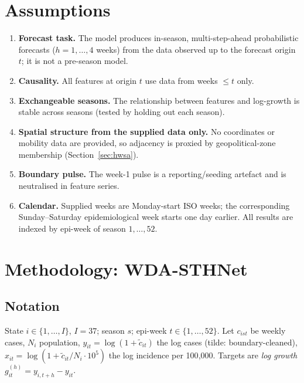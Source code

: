 \documentclass[11pt,a4paper]{article}
\begin{document}
\section{Assumptions}
\begin{enumerate}
\item[\textbf{A1}] \textbf{Forecast task.} The model produces in-season, multi-step-ahead probabilistic forecasts ($h=1,\dots,4$ weeks) from the data observed up to the forecast origin $t$; it is not a pre-season model.
\item[\textbf{A2}] \textbf{Causality.} All features at origin $t$ use data from weeks $\le t$ only.
\item[\textbf{A3}] \textbf{Exchangeable seasons.} The relationship between features and log-growth is stable across seasons (tested by holding out each season).
\item[\textbf{A4}] \textbf{Spatial structure from the supplied data only.} No coordinates or mobility data are provided, so adjacency is proxied by geopolitical-zone membership (Section~\ref{sec:hwsa}).
\item[\textbf{A5}] \textbf{Boundary pulse.} The week-1 pulse is a reporting/seeding artefact and is neutralised in feature series.
\item[\textbf{A6}] \textbf{Calendar.} Supplied weeks are Monday-start ISO weeks; the corresponding Sunday--Saturday epidemiological week starts one day earlier. All results are indexed by epi-week of season $1,\dots,52$.
\end{enumerate}

\section{Methodology: WDA-STHNet}\label{sec:method}
\subsection{Notation}
State $i\in\{1,\dots,I\}$, $I=37$; season $s$; epi-week $t\in\{1,\dots,52\}$. Let $c_{ist}$ be weekly cases, $N_i$ population, $y_{it}=\log(1+\tilde c_{it})$ the log cases (tilde: boundary-cleaned), $x_{it}=\log(1+\tilde c_{it}/N_i\cdot 10^5)$ the log incidence per 100{,}000. Targets are \emph{log growth} $g^{(h)}_{it}=y_{i,t+h}-y_{it}$.
\end{document}
